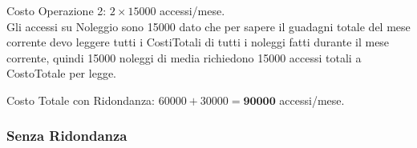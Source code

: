 \documentclass[11pt,a4paper]{article}
\begin{document}
\begin{itemize}
          \vspace{0.1cm}
          \noindent
          Costo Operazione 2: $2 \times 15000$ accessi/mese. \\
          Gli accessi su Noleggio sono 15000 dato che per sapere il guadagni totale del mese corrente devo leggere tutti i CostiTotali di tutti i noleggi fatti
          durante il mese corrente, quindi 15000 noleggi di media richiedono 15000 accessi totali a CostoTotale per legge.

\end{itemize}

Costo Totale con Ridondanza: $60000 + 30000 = \mathbf{90000}$ accessi/mese.

\subsubsection{Senza Ridondanza}
\vspace{0.3cm}
\end{document}

